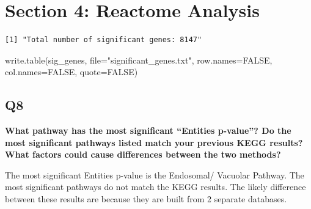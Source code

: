 \documentclass[
  letterpaper,
  DIV=11,
  numbers=noendperiod]{scrartcl}
\newenvironment{Shaded}{\begin{snugshade}}{\end{snugshade}}
\newcommand{\AttributeTok}[1]{\textcolor[rgb]{0.40,0.45,0.13}{#1}}
\newcommand{\ConstantTok}[1]{\textcolor[rgb]{0.56,0.35,0.01}{#1}}
\newcommand{\FloatTok}[1]{\textcolor[rgb]{0.68,0.00,0.00}{#1}}
\newcommand{\FunctionTok}[1]{\textcolor[rgb]{0.28,0.35,0.67}{#1}}
\newcommand{\NormalTok}[1]{\textcolor[rgb]{0.00,0.23,0.31}{#1}}
\newcommand{\OtherTok}[1]{\textcolor[rgb]{0.00,0.23,0.31}{#1}}
\newcommand{\SpecialCharTok}[1]{\textcolor[rgb]{0.37,0.37,0.37}{#1}}
\newcommand{\StringTok}[1]{\textcolor[rgb]{0.13,0.47,0.30}{#1}}
\begin{document}
\hypertarget{section-4-reactome-analysis}{%
\section{Section 4: Reactome
Analysis}\label{section-4-reactome-analysis}}

\begin{Shaded}
\end{Shaded}

\begin{verbatim}
[1] "Total number of significant genes: 8147"
\end{verbatim}

\begin{Shaded}
\begin{Highlighting}[]
\FunctionTok{write.table}\NormalTok{(sig\_genes, }\AttributeTok{file=}\StringTok{"significant\_genes.txt"}\NormalTok{, }\AttributeTok{row.names=}\ConstantTok{FALSE}\NormalTok{, }\AttributeTok{col.names=}\ConstantTok{FALSE}\NormalTok{, }\AttributeTok{quote=}\ConstantTok{FALSE}\NormalTok{)}
\end{Highlighting}
\end{Shaded}

\hypertarget{q8}{%
\subsection{\texorpdfstring{\textbf{Q8}}{Q8}}\label{q8}}

\textbf{What pathway has the most significant ``Entities p-value''? Do
the most significant pathways listed match your previous KEGG results?
What factors could cause differences between the two methods?}

The most significant Entities p-value is the Endosomal/ Vacuolar
Pathway. The most significant pathways do not match the KEGG results.
The likely difference between these results are because they are built
from 2 separate databases.
\end{document}
